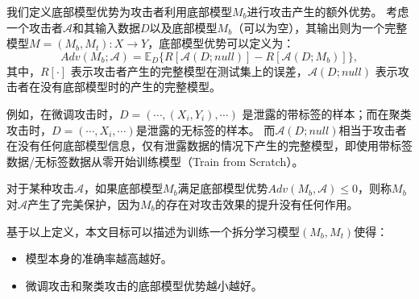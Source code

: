 \begin{definition}[底部模型优势]
    我们定义底部模型优势为攻击者利用底部模型$M_b$进行攻击产生的额外优势。
    考虑一个攻击者$\mathcal A$和其输入数据$D$以及底部模型$M_b$（可以为空），其输出则为一个完整模型$M = (M_b, M_t): X \to Y$，底部模型优势可以定义为：
    \begin{equation}
        Adv(M_b; \mathcal A) = \mathbb E_D \{ R[\mathcal A(D; null)] - R[\mathcal A(D; M_b)]\},
    \end{equation}
    其中，$R[\cdot]$ 表示攻击者产生的完整模型在测试集上的误差，$\mathcal A(D; null)$ 表示攻击者在没有底部模型时的产生的完整模型。
\end{definition}
%
例如，在微调攻击时，$D = (\cdots, (X_i, Y_i), \cdots)$ 是泄露的带标签的样本；而在聚类攻击时，$D = (\cdots, X_i, \cdots)$是泄露的无标签的样本。
%
而$\mathcal A(D; null)$相当于攻击者在没有任何底部模型信息，仅有泄露数据的情况下产生的完整模型，即使用带标签数据/无标签数据从零开始训练模型（Train from Scratch）。

\begin{definition}[完美保护]
    对于某种攻击$\mathcal A$，如果底部模型$M_b$满足底部模型优势$Adv(M_b, \mathcal A) \le 0$，则称$M_b$对$\mathcal A$产生了完美保护，因为$M_b$的存在对攻击效果的提升没有任何作用。
\end{definition}

基于以上定义，本文目标可以描述为训练一个拆分学习模型$(M_b, M_t)$使得：
\begin{itemize}
    \item 模型本身的准确率越高越好。
    \item 微调攻击和聚类攻击的底部模型优势越小越好。
\end{itemize}